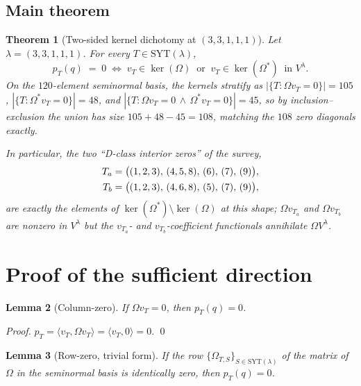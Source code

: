 \documentclass[11pt]{article}
\newtheorem{theorem}{Theorem}
\newtheorem{lemma}[theorem]{Lemma}
\theoremstyle{definition}
\newcommand{\Vlam}{V^\lambda}
\newcommand{\Om}{\Omega}
\newcommand{\Omstar}{\Omega^{\ast}}
\newcommand{\SYT}{\mathrm{SYT}}
\newcommand{\pT}{p_T}
\begin{document}
\subsection{Main theorem}

\begin{theorem}[Two-sided kernel dichotomy at $(3,3,1,1,1)$]\label{thm:main}
Let $\lambda = (3,3,1,1,1)$. For every $T \in \SYT(\lambda)$,
\begin{equation}\label{eq:dichotomy}
   \pT(q) \;=\; 0
   \;\Longleftrightarrow\;
   v_T \in \ker(\Om) \;\;\text{or}\;\; v_T \in \ker(\Omstar)
   \;\;\text{in }\Vlam.
\end{equation}
On the $120$-element seminormal basis, the kernels stratify as
$|\{T : \Om v_T = 0\}| = 105$,
$|\{T : \Omstar v_T = 0\}| = 48$, and
$|\{T : \Om v_T = 0\,\wedge\, \Omstar v_T = 0\}| = 45$, so by
inclusion--exclusion the union has size
$105 + 48 - 45 = 108$, matching the $108$ zero diagonals exactly.

In particular, the two ``D-class interior zeros'' of the survey,
\begin{align}
   T_a &= \bigl((1,2,3),\,(4,5,8),\,(6),\,(7),\,(9)\bigr), \notag\\
   T_b &= \bigl((1,2,3),\,(4,6,8),\,(5),\,(7),\,(9)\bigr), \notag
\end{align}
are exactly the elements of $\ker(\Omstar) \setminus \ker(\Om)$ at this
shape; $\Om v_{T_a}$ and $\Om v_{T_b}$ are nonzero in $\Vlam$ but the
$v_{T_a}$- and $v_{T_b}$-coefficient functionals annihilate $\Om \Vlam$.
\end{theorem}

\section{Proof of the sufficient direction}\label{sec:sufficient}

\begin{lemma}[Column-zero]\label{lem:col-zero}
If $\Om v_T = 0$, then $\pT(q) = 0$.
\end{lemma}

\begin{proof}
$\pT = \langle v_T, \Om v_T \rangle = \langle v_T, 0 \rangle = 0$. \qed
\end{proof}

\begin{lemma}[Row-zero, trivial form]\label{lem:row-zero-triv}
If the row $\{\Om_{T, S}\}_{S \in \SYT(\lambda)}$ of the matrix of $\Om$ in
the seminormal basis is identically zero, then $\pT(q) = 0$.
\end{lemma}
\end{document}
